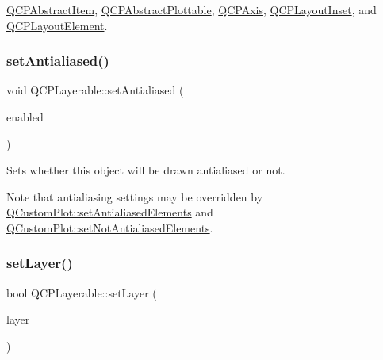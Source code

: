 \hyperlink{classQCPAbstractItem_ae41d0349d68bb802c49104afd100ba2a}{Q\+C\+P\+Abstract\+Item}, \hyperlink{classQCPAbstractPlottable_addb3f5c41f007a78c3e142cc605bc712}{Q\+C\+P\+Abstract\+Plottable}, \hyperlink{classQCPAxis_a63b7103c57fe9acfbce164334ea837f8}{Q\+C\+P\+Axis}, \hyperlink{classQCPLayoutInset_a2eeef7ea1b8340e7c7c2e2fc229df5ea}{Q\+C\+P\+Layout\+Inset}, and \hyperlink{classQCPLayoutElement_ae97f483cccedadbf18ea4525ef240ee4}{Q\+C\+P\+Layout\+Element}.

\mbox{\label{classQCPLayerable_a4fd43e89be4a553ead41652565ff0581}} 
\subsubsection{\texorpdfstring{set\+Antialiased()}{setAntialiased()}}
{\footnotesize\ttfamily void Q\+C\+P\+Layerable\+::set\+Antialiased (\begin{DoxyParamCaption}\item[{bool}]{enabled }\end{DoxyParamCaption})}

Sets whether this object will be drawn antialiased or not.

Note that antialiasing settings may be overridden by \hyperlink{classQCustomPlot_af6f91e5eab1be85f67c556e98c3745e8}{Q\+Custom\+Plot\+::set\+Antialiased\+Elements} and \hyperlink{classQCustomPlot_ae10d685b5eabea2999fb8775ca173c24}{Q\+Custom\+Plot\+::set\+Not\+Antialiased\+Elements}. \mbox{\label{classQCPLayerable_ab0d0da6d2de45a118886d2c8e16d5a54}} 
\subsubsection{\texorpdfstring{set\+Layer()}{setLayer()}\hspace{0.1cm}{\footnotesize\ttfamily [1/2]}}
{\footnotesize\ttfamily bool Q\+C\+P\+Layerable\+::set\+Layer (\begin{DoxyParamCaption}\item[{\hyperlink{classQCPLayer}{Q\+C\+P\+Layer} $\ast$}]{layer }\end{DoxyParamCaption})}

